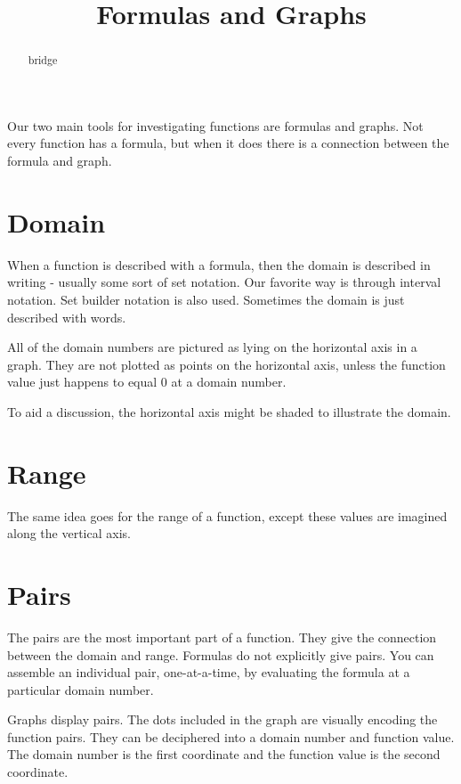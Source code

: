 \documentclass{ximera}
\title{Formulas and Graphs}
\begin{document}
\begin{abstract}
bridge
\end{abstract}
\maketitle



Our two main tools for investigating functions are formulas and graphs. Not every function has a formula, but when it does there is a connection between the formula and graph.

\section{Domain}
When a function is described with a formula, then the domain is described in writing - usually some sort of set notation.  Our favorite way is through interval notation.  Set builder notation is also used.  Sometimes the domain is just described with words.

All of the domain numbers are pictured as lying on the horizontal axis in a graph.  They are not plotted as points on the horizontal axis, unless the function value just happens to equal $0$ at a domain number.

To aid a discussion, the horizontal axis might be shaded to illustrate the domain.







\section{Range}
The same idea goes for the range of a function, except these values are imagined along the vertical axis.








\section{Pairs}
The pairs are the most important part of a function.  They give the connection between the domain and range.  Formulas do not explicitly give pairs. You can assemble an individual pair, one-at-a-time, by evaluating the formula at a particular domain number.

Graphs display pairs.  The dots included in the graph are visually encoding the function pairs.  They can be deciphered into a domain number and function value. The domain number is the first coordinate and the function value is the second coordinate.
\end{document}
